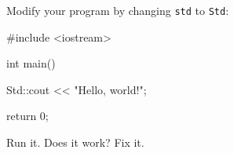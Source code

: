 Modify your program by changing \verb!std! to \verb!Std!:
\begin{console}
#include <iostream>

int main()
{
    Std::cout << "Hello, world!\n";

    return 0;
}
\end{console}
Run it. Does it work? Fix it.
